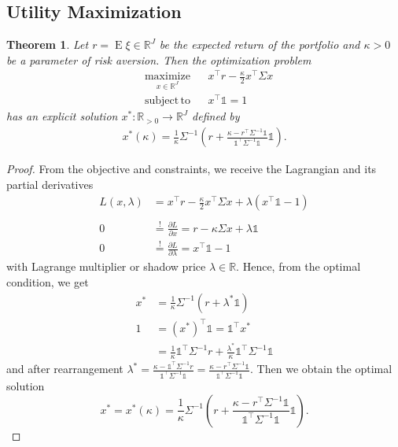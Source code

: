 \documentclass[a4paper, english, 11pt, onecolumn, oneside, final]{article}
\numberwithin{equation}{section}   %
\DeclareMathOperator{\E}{\mathrm{E}}	    %
\newcommand{\R}{\mathbb{R}}                 %
\newcommand{\one}{\mathds 1}
\newcommand{\precision}{\Sigma^{-1}}
\newcommand{\B}{r^\top\Sigma^{-1}\one}
\newcommand{\C}{\one^\top\Sigma^{-1}\one}
\theoremstyle{plain}
\newtheorem{theorem}             {Theorem}[section]
\theoremstyle{definition}
\theoremstyle{remark}
\begin{document}
\subsection{Utility Maximization}
\begin{theorem}
    Let $r = \E\xi \in\R^J$ be the expected return of the portfolio and $\kappa>0$ be a parameter of risk aversion. Then the optimization problem
    \begin{equation*}
        \begin{aligned}
            & \underset{x\in\R^J}{\mathrm{maximize}} & & x^\top r - \frac{\kappa}{2}x^\top\Sigma x \\
            & \mathrm{subject\,to} & & x^\top\one = 1
        \end{aligned}
    \end{equation*}
    has an explicit solution $x^*\colon\R_{>0}\to\R^J$ defined by
    \begin{equation}
    \label{eq:utility-maximization}
        \begin{aligned}
            x^*(\kappa) = \frac{1}{\kappa}\precision\left(r+\frac{\kappa-r^\top\precision\one}{\one^\top\precision\one}\one\right).
        \end{aligned}
    \end{equation}
\end{theorem}
\begin{proof}
    From the objective and constraints, we receive the Lagrangian and its partial derivatives
    \begin{equation*}
        \begin{aligned}
            L(x,\lambda) &= x^\top r - \frac{\kappa}{2}x^\top\Sigma x + \lambda(x^\top\one - 1) \\\\
            0 &\overset{!}{=} \frac{\partial L}{\partial x} = r - \kappa\Sigma x + \lambda\one \\
            0 &\overset{!}{=} \frac{\partial L}{\partial \lambda} = x^\top\one - 1
        \end{aligned}
    \end{equation*}
    with Lagrange multiplier or shadow price $\lambda\in\R$. Hence, from the optimal condition, we get
    \begin{equation*}
        \begin{aligned}
            x^* &= \frac{1}{\kappa}\precision(r+\lambda^*\one) \\
            1 &= (x^*)^\top\one = \one^\top x^* \\
            &= \frac{1}{\kappa}\one^\top\precision r + \frac{\lambda^*}{\kappa}\one^\top\precision\one
        \end{aligned}
    \end{equation*}
    and after rearrangement $\lambda^*=\frac{\kappa-\one^\top\precision r}{\C}=\frac{\kappa-\B}{\C}$. Then we obtain the optimal solution
    \begin{equation*}
        x^* = x^*(\kappa) = \frac{1}{\kappa}\precision\left(r+\frac{\kappa-\B}{\C}\one\right).
    \end{equation*}
\end{proof}
\end{document}
